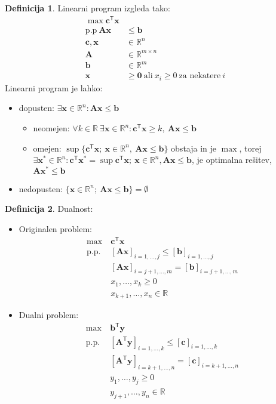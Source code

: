 \documentclass[11pt]{article}
\newcommand{\R}{\mathbb{R}}
\newcommand{\set}[1]{\{#1\}}
\newcommand{\oglati}[1]{\left[#1\right]}
\newcommand{\T}{\textsf{T}}
\newcommand{\x}{\mathbf{x}}
\newcommand{\y}{\mathbf{y}}
\renewcommand{\b}{\mathbf{b}}
\renewcommand{\c}{\mathbf{c}}
\renewcommand{\AA}{\mathbf{A}}
\newcommand{\1}{\mathbbm{1}}
\theoremstyle{definition}
\newtheorem{definicija}{Definicija}[section]
\theoremstyle{definition}
\theoremstyle{definition}
\theoremstyle{definition}
\begin{document}
\begin{definicija}

Linearni program izgleda tako:
\begin{align*}
\max \c^\T \x& \\
\text{p.p}~ \AA\x &\leq \b \\
\c,\x &\in \R^n \\
\AA &\in \R^{m \times n} \\
\b &\in \R^m \\
\x &\geq \mathbf{0} ~\text{ali}~ x_i \geq 0 ~\text{za nekatere}~ i
\end{align*}
Linearni program je lahko:
\begin{itemize}
	\item dopusten: $\exists \x \in \R^n: \AA\x \leq \b$
	\begin{itemize}
		\item neomejen: $\forall k \in \R~\exists \x \in \R^n: \c^\T\x \geq k,~\AA\x\leq\b$
		\item omejen: $\sup\set{\c^\T\x; ~\x\in\R^n,~\AA\x\leq\b}$ obstaja in je $\max$, torej $\exists \x^* \in \R^n: \c^\T\x^* = \sup{\c^\T\x; ~\x\in\R^n,\AA\x\leq\b}$, je optimalna rešitev, $\AA\x^*\leq\b$
	\end{itemize}
	\item nedopusten: $\set{\x \in \R^n; ~\AA\x \leq \b} = \emptyset$
\end{itemize}

\end{definicija}
\vspace{0.5cm}

\begin{definicija} Dualnost:
\begin{itemize}

\item Originalen problem:
\begin{align*}
\max ~&\c^\T\x \\
\text{p.p.}~ &\oglati{\AA\x}_{i = 1,\ldots,j} \leq \oglati{\b}_{i=1,\ldots,j} \\
&\oglati{\AA\x}_{i = j+1,\ldots,m} = \oglati{\b}_{i=j+1,\ldots,m} \\
&x_1,\ldots,x_k \geq 0 \\
&x_{k+1},\ldots,x_n \in \R
\end{align*}

\item Dualni problem:
\begin{align*}
\max ~&\b^\T\y \\
\text{p.p.}~ &\oglati{\AA^\T\y}_{i = 1,\ldots,k} \leq \oglati{\c}_{i=1,\ldots,k} \\
&\oglati{\AA^\T\y}_{i = k+1,\ldots,n} = \oglati{\c}_{i=k+1,\ldots,n} \\
&y_1,\ldots,y_j \geq 0 \\
&y_{j+1},\ldots,y_n \in \R
\end{align*}

\end{itemize}
\end{definicija}
\vspace{0.5cm}
\end{document}
